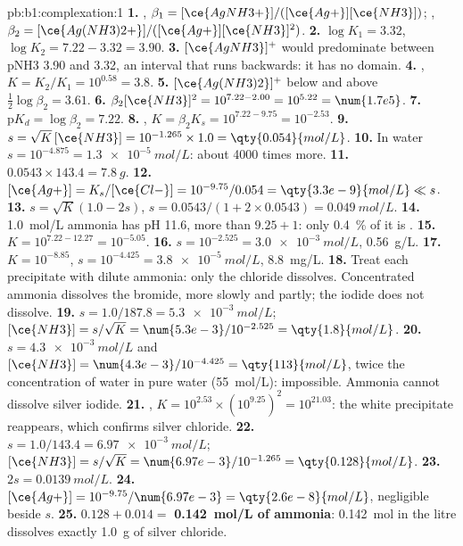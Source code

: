 \begin{solution}{pb:b1:complexation:1}
\textbf{1.} , $\beta_1 = [\ce{AgNH3+}]/([\ce{Ag+}][\ce{NH3}])$;
, $\beta_2 = [\ce{Ag(NH3)2+}]/([\ce{Ag+}][\ce{NH3}]^2)$.
\textbf{2.} $\log K_1 = 3.32$, $\log K_2 = 7.22 - 3.32 = 3.90$.
\textbf{3.} $[\ce{AgNH3}]^{+}$ would predominate between pNH3 3.90 and 3.32,
an interval that runs backwards: it has no domain.
\textbf{4.} , $K = K_2/K_1 = 10^{0.58} =
3.8$.
\textbf{5.} $[\ce{Ag(NH3)2}]^{+}$ below and  above
$\frac12\log\beta_2 = 3.61$.
\textbf{6.} $\beta_2[\ce{NH3}]^2 = 10^{7.22 - 2.00} = 10^{5.22} = \num{1.7e5}$.
\textbf{7.} $\mathrm{p}K_d = \log\beta_2 = 7.22$.
\textbf{8.} , $K = \beta_2K_s =
10^{7.22 - 9.75} = 10^{-2.53}$.
\textbf{9.} $s = \sqrt{K}\,[\ce{NH3}] = 10^{-1.265} \times 1.0 =
\qty{0.054}{mol/L}$.
\textbf{10.} In water $s = 10^{-4.875} = \qty{1.3e-5}{mol/L}$: about 4000
times more.
\textbf{11.} $0.0543 \times 143.4 = \qty{7.8}{g}$.
\textbf{12.} $[\ce{Ag+}] = K_s/[\ce{Cl-}] = 10^{-9.75}/0.054 =
\qty{3.3e-9}{mol/L} \ll s$.
\textbf{13.} $s = \sqrt{K}(1.0 - 2s)$, $s = 0.0543/(1 + 2 \times 0.0543) =
\qty{0.049}{mol/L}$.
\textbf{14.} \qty{1.0}{mol/L} ammonia has pH 11.6, more than $9.25 + 1$:
only \qty{0.4}{\percent} of it is .
\textbf{15.} $K = 10^{7.22 - 12.27} = 10^{-5.05}$.
\textbf{16.} $s = 10^{-2.525} = \qty{3.0e-3}{mol/L}$, \qty{0.56}{g/L}.
\textbf{17.} $K = 10^{-8.85}$, $s = 10^{-4.425} = \qty{3.8e-5}{mol/L}$,
\qty{8.8}{mg/L}.
\textbf{18.} Treat each precipitate with dilute ammonia: only the chloride
dissolves. Concentrated ammonia dissolves the bromide, more slowly and
partly; the iodide does not dissolve.
\textbf{19.} $s = 1.0/187.8 = \qty{5.3e-3}{mol/L}$; $[\ce{NH3}] = s/\sqrt{K}
= \num{5.3e-3}/10^{-2.525} = \qty{1.8}{mol/L}$.
\textbf{20.} $s = \qty{4.3e-3}{mol/L}$ and $[\ce{NH3}] = \num{4.3e-3}/10^{-4.425}
= \qty{113}{mol/L}$, twice the concentration of water in pure water
(\qty{55}{mol/L}): impossible. Ammonia cannot dissolve silver iodide.
\textbf{21.} ,
$K = 10^{2.53} \times (10^{9.25})^2 = 10^{21.03}$: the white precipitate
reappears, which confirms silver chloride.
\textbf{22.} $s = 1.0/143.4 = \qty{6.97e-3}{mol/L}$; $[\ce{NH3}] =
s/\sqrt{K} = \num{6.97e-3}/10^{-1.265} = \qty{0.128}{mol/L}$.
\textbf{23.} $2s = \qty{0.0139}{mol/L}$.
\textbf{24.} $[\ce{Ag+}] = 10^{-9.75}/\num{6.97e-3} = \qty{2.6e-8}{mol/L}$,
negligible beside $s$.
\textbf{25.} $0.128 + 0.014 = $ \textbf{\qty{0.142}{mol/L} of ammonia}:
\qty{0.142}{mol} in the litre dissolves exactly \qty{1.0}{g} of silver
chloride.
\end{solution}
